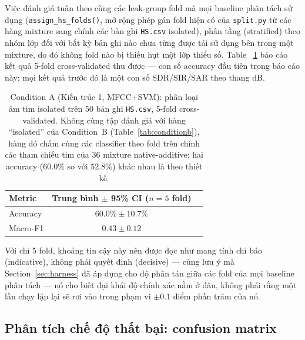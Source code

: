 \documentclass[11pt]{article}
\begin{document}
Việc đánh giá tuân theo cùng các leak-group fold mà mọi baseline phân
tách sử dụng (\texttt{assign\_hs\_folds()}, mở rộng phép gán fold hiện có
của \texttt{split.py} từ các hàng mixture sang chính các bản ghi
\texttt{HS.csv} isolated), phân tầng (stratified) theo nhóm lớp đối với
bất kỳ bản ghi nào chưa từng được tái sử dụng bên trong một mixture, do
đó không fold nào bị thiếu hụt một lớp thiểu số. Table~
\ref{tab:conditionAfold} báo cáo kết quả 5-fold cross-validated thu được
--- con số accuracy đầu tiên trong báo cáo này; mọi kết quả trước đó là
một con số SDR/SIR/SAR theo thang dB.

\begin{table}[H]
\centering
\caption{Condition A (Kiến trúc 1, MFCC+SVM): phân loại âm tim isolated trên 50 bản ghi \texttt{HS.csv}, 5-fold cross-validated. Không cùng tập đánh giá với hàng ``isolated'' của Condition~B (Table~\ref{tab:conditionb}), hàng đó chấm cùng các classifier theo fold trên chính các tham chiếu tim của 36 mixture native-additive; hai accuracy ($60.0\%$ so với $52.8\%$) khác nhau là theo thiết kế.}
\label{tab:conditionAfold}
\begin{tabular}{@{}lcc@{}}
\toprule
Metric & Trung bình $\pm$ 95\% CI ($n{=}5$ fold) & \\
\midrule
Accuracy & $60.0\% \pm 10.7\%$ & \\
Macro-F1 & $0.43 \pm 0.12$ & \\
\bottomrule
\end{tabular}
\end{table}

Với chỉ 5 fold, khoảng tin cậy này nên được đọc như mang tính chỉ báo
(indicative), không phải quyết định (decisive) --- cùng lưu ý mà
Section~\ref{sec:harness} đã áp dụng cho độ phân tán giữa các fold của
mọi baseline phân tách --- nó cho biết đại khái độ chính xác nằm ở đâu,
không phải rằng một lần chạy lặp lại sẽ rơi vào trong phạm vi $\pm 0.1$
điểm phần trăm của nó.

\subsection{Phân tích chế độ thất bại: confusion matrix}
\label{sec:classifier-failure}
\end{document}
